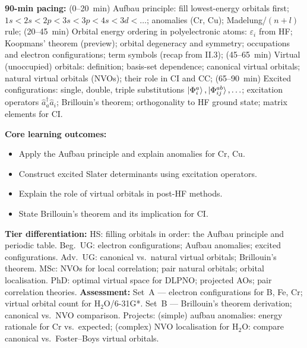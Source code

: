 \documentclass[11pt,a4paper]{article}
\begin{document}
\begin{tcolorbox}[chembox, title={Module~III.2 / L08: Electronic Configurations, Aufbau, and Virtual Orbitals}]
\textbf{90-min pacing:} (0--20~min) Aufbau principle: fill lowest-energy orbitals first; $1s<2s<2p<3s<3p<4s<3d<\ldots$; anomalies (Cr, Cu); Madelung/$(n+l)$ rule; (20--45~min) Orbital energy ordering in polyelectronic atoms: $\varepsilon_i$ from HF; Koopmans' theorem (preview); orbital degeneracy and symmetry; occupations and electron configurations; term symbols (recap from II.3); (45--65~min) Virtual (unoccupied) orbitals: definition; basis-set dependence; canonical virtual orbitals; natural virtual orbitals (NVOs); their role in CI and CC; (65--90~min) Excited configurations: single, double, triple substitutions $\ket{\Phi_i^a},\ket{\Phi_{ij}^{ab}},\ldots$; excitation operators $\hat{a}^\dagger_a\hat{a}_i$; Brillouin's theorem; orthogonality to HF ground state; matrix elements for CI.

\medskip\textbf{Core learning outcomes:}
\begin{itemize}[leftmargin=1.4em,topsep=2pt,itemsep=1pt]
  \item Apply the Aufbau principle and explain anomalies for Cr, Cu.
  \item Construct excited Slater determinants using excitation operators.
  \item Explain the role of virtual orbitals in post-HF methods.
  \item State Brillouin's theorem and its implication for CI.
\end{itemize}
\medskip\textbf{Tier differentiation:}
HS: filling orbitals in order: the Aufbau principle and periodic table.
Beg.\ UG: electron configurations; Aufbau anomalies; excited configurations.
Adv.\ UG: canonical vs.\ natural virtual orbitals; Brillouin's theorem.
MSc: NVOs for local correlation; pair natural orbitals; orbital localisation.
PhD: optimal virtual space for DLPNO; projected AOs; pair correlation theories.
\medskip\textbf{Assessment:}
Set~A --- electron configurations for B, Fe, Cr; virtual orbital count for H$_2$O/6-31G*.
Set~B --- Brillouin's theorem derivation; canonical vs.\ NVO comparison.
Projects: (simple) aufbau anomalies: energy rationale for Cr vs.\ expected; (complex) NVO localisation for H$_2$O: compare canonical vs.\ Foster--Boys virtual orbitals.
\end{tcolorbox}

\medskip
\end{document}

